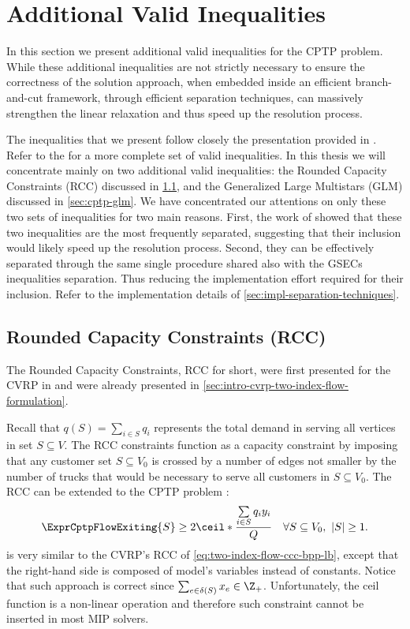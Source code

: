 \section{Additional Valid Inequalities}
\label{sec:cptp-additional-valid-inequalities}

In this section we present additional valid inequalities for the CPTP problem.
While these additional inequalities are not strictly necessary
to ensure the correctness of the solution approach,
when embedded inside an efficient branch-and-cut framework,
through efficient separation techniques,
can massively strengthen the linear relaxation and thus speed up the resolution process.

The inequalities that we present follow closely the presentation provided in \textcite{jepsen2014}.
Refer to the \textcite{jepsen2014} for a more complete set of valid inequalities.
In this thesis we will concentrate mainly on two additional valid inequalities:
the Rounded Capacity Constraints (RCC) discussed in \cref{sec:cptp-rcc},
and the Generalized Large Multistars (GLM) discussed in \cref{sec:cptp-glm}.
We have concentrated our attentions on only these two sets of inequalities
for two main reasons.
First, the work of \textcite{jepsen2014} showed that these two inequalities are the most frequently
separated, suggesting that their inclusion would likely speed up the resolution process.
Second,
they can be effectively separated through the same single procedure
shared also with the GSECs inequalities separation.
Thus reducing the implementation effort required for their inclusion.
Refer to the implementation details of \cref{sec:impl-separation-techniques}.

\subsection{Rounded Capacity Constraints (RCC)}
\label{sec:cptp-rcc}

The Rounded Capacity Constraints, RCC for short, were first presented
for the CVRP  in \textcite{laporte1983}
and were already presented in \cref{sec:intro-cvrp-two-index-flow-formulation}.

Recall that $q(S) = \sum_{i \in S} q_i$ represents
the total demand in serving all vertices in set $S \subseteq V$.
The RCC constraints function as a capacity constraint
by imposing that any customer set $S \subseteq V_0$ is crossed by a number of edges
not smaller by the number of trucks that would be necessary to serve all customers in $S \subseteq V_0$.
The RCC can be extended to the CPTP problem \parencite{jepsen2014}:
\begin{equation}
	\label{eq:cptp-rcc-inequality-original}
	\ExprCptpFlowExiting{S} \ge 2 \ceil*{\frac{\sum\limits_{i \in S} q_i y_i}{Q}} \quad \forall S \subseteq V_0,\ |S| \ge 1.
\end{equation}
is very similar to the CVRP's RCC of \cref{eq:two-index-flow-ccc-bpp-lb},
except that the right-hand side is composed of model's variables instead of constants.
Notice that such approach is correct since $\sum_{e \in \delta(S)} x_e \in \Z_+$.
Unfortunately, the ceil function is a non-linear operation and therefore
such constraint cannot be inserted in most MIP solvers.

